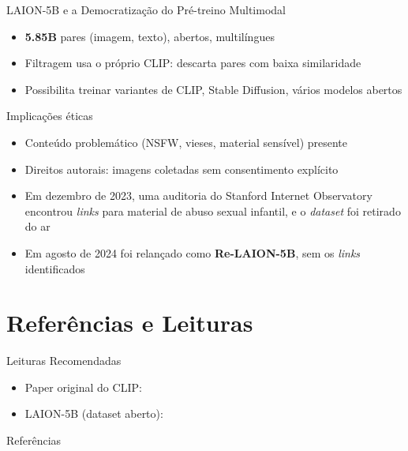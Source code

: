 \documentclass[aspectratio=169,xcolor=dvipsnames]{beamer}
\begin{document}
  \begin{frame}{LAION-5B e a Democratização do Pré-treino Multimodal}
    \begin{itemize}
      \item \textbf{5.85B} pares (imagem, texto), abertos, multilíngues
      \item Filtragem usa o próprio CLIP: descarta pares com baixa similaridade
      \item Possibilita treinar variantes de CLIP, Stable Diffusion, vários modelos abertos
    \end{itemize}

    \vspace{0.4em}
    \begin{alertblock}{Implicações éticas}
      \begin{itemize}
        \item Conteúdo problemático (NSFW, vieses, material sensível) presente
        \item Direitos autorais: imagens coletadas sem consentimento explícito
        \item Em dezembro de 2023, uma auditoria do Stanford Internet Observatory encontrou \textit{links} para material de abuso sexual infantil, e o \textit{dataset} foi retirado do ar
        \item Em agosto de 2024 foi relançado como \textbf{Re-LAION-5B}, sem os \textit{links} identificados
      \end{itemize}
    \end{alertblock}
  \end{frame}

  \section*{Referências e Leituras}

  \begin{frame}[allowframebreaks]{Leituras Recomendadas}
    \leiturasize
    \begin{itemize}\setlength{\itemsep}{0.3em}
      \item Paper original do CLIP: 
      \item LAION-5B (dataset aberto): 
    \end{itemize}
  \end{frame}

  \begin{frame}[allowframebreaks]{Referências}
    \sloppy
    \printbibliography[heading=none]
  \end{frame}
\end{document}
